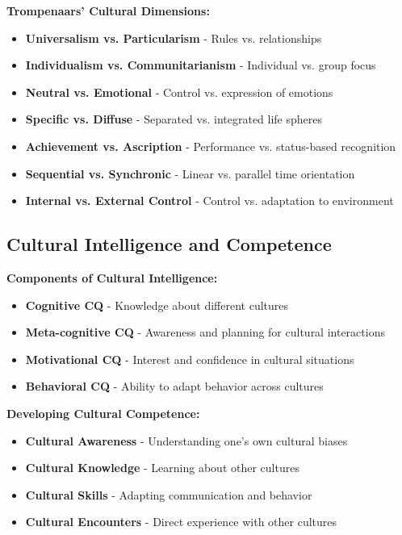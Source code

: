 \documentclass[12pt]{article}
\begin{document}
\textbf{Trompenaars' Cultural Dimensions:}
\begin{itemize}
    \item \textbf{Universalism vs. Particularism} - Rules vs. relationships
    \item \textbf{Individualism vs. Communitarianism} - Individual vs. group focus
    \item \textbf{Neutral vs. Emotional} - Control vs. expression of emotions
    \item \textbf{Specific vs. Diffuse} - Separated vs. integrated life spheres
    \item \textbf{Achievement vs. Ascription} - Performance vs. status-based recognition
    \item \textbf{Sequential vs. Synchronic} - Linear vs. parallel time orientation
    \item \textbf{Internal vs. External Control} - Control vs. adaptation to environment
\end{itemize}

\subsection{Cultural Intelligence and Competence}

\textbf{Components of Cultural Intelligence:}
\begin{itemize}
    \item \textbf{Cognitive CQ} - Knowledge about different cultures
    \item \textbf{Meta-cognitive CQ} - Awareness and planning for cultural interactions
    \item \textbf{Motivational CQ} - Interest and confidence in cultural situations
    \item \textbf{Behavioral CQ} - Ability to adapt behavior across cultures
\end{itemize}

\textbf{Developing Cultural Competence:}
\begin{itemize}
    \item \textbf{Cultural Awareness} - Understanding one's own cultural biases
    \item \textbf{Cultural Knowledge} - Learning about other cultures
    \item \textbf{Cultural Skills} - Adapting communication and behavior
    \item \textbf{Cultural Encounters} - Direct experience with other cultures
\end{itemize}
\end{document}
